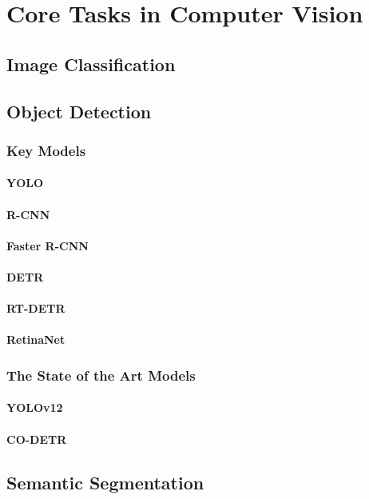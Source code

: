 \part{Core Tasks in Computer Vision}

\chapter{Image Classification}

\chapter{Object Detection}
\section{Key Models}
\subsection{YOLO}
\subsection{R-CNN}
\subsection{Faster R-CNN}
\subsection{DETR}
\subsection{RT-DETR}
\subsection{RetinaNet}
\section{The State of the Art Models}
\subsection{YOLOv12}
\subsection{CO-DETR}

\chapter{Semantic Segmentation}
